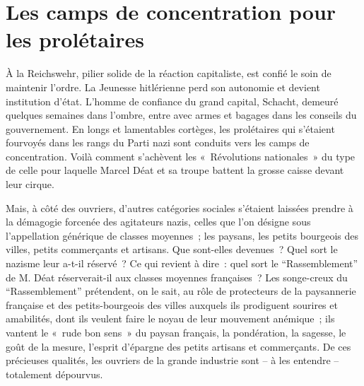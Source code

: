 \documentclass[french,twoside]{book} %
\begin{document}
\section[{Les camps de concentration pour les prolétaires}]{Les camps de concentration pour les prolétaires}
\noindent À la Reichswehr, pilier solide de la réaction capitaliste, est confié le soin de maintenir l’ordre. La Jeunesse hitlérienne perd son autonomie et devient institution d’état. L’homme de confiance du grand capital, Schacht, demeuré quelques semaines dans l’ombre, entre avec armes et bagages dans les conseils du gouvernement. En longs et lamentables cortèges, les prolétaires qui s’étaient fourvoyés dans les rangs du Parti nazi sont conduits vers les camps de concentration. Voilà comment s’achèvent les « Révolutions nationales » du type de celle pour laquelle Marcel Déat et sa troupe battent la grosse caisse devant leur cirque.\par
Mais, à côté des ouvriers, d’autres catégories sociales s’étaient laissées prendre à la démagogie forcenée des agitateurs nazis, celles que l’on désigne sous l’appellation générique de classes moyennes ; les paysans, les petits bourgeois des villes, petits commerçants et artisans. Que sont-elles devenues ? Quel sort le nazisme leur a-t-il réservé ? Ce qui revient à dire : quel sort le “Rassemblement” de M. Déat réserverait-il aux classes moyennes françaises ? Les songe-creux du “Rassemblement” prétendent, on le sait, au rôle de protecteurs de la paysannerie française et des petits-bourgeois des villes auxquels ils prodiguent sourires et amabilités, dont ils veulent faire le noyau de leur mouvement anémique ; ils vantent le « rude bon sens » du paysan français, la pondération, la sagesse, le goût de la mesure, l’esprit d’épargne des petits artisans et commerçants. De ces précieuses qualités, les ouvriers de la grande industrie sont – à les entendre – totalement dépourvus.
\end{document}
